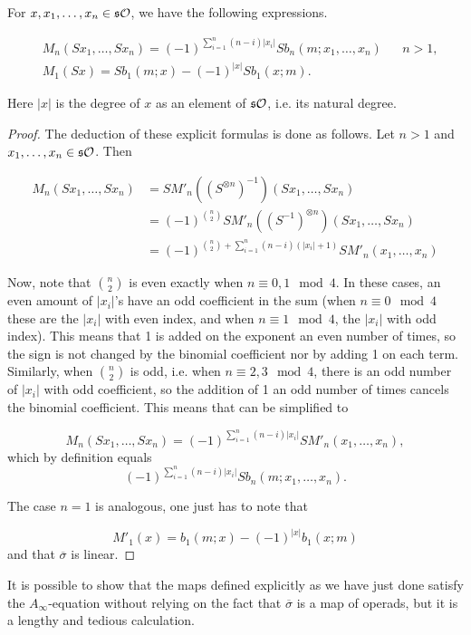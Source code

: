 \documentclass[Thesis.tex]{subfiles}
\begin{document}
\begin{lem}\label{explicit}
For $x,x_1,\dots,x_n\in\mathfrak{s}{\mathcal O}$, we have the following expressions.

\begin{align*}
&M_n(Sx_1,\dots, Sx_n)=(-1)^{\sum_{i=1}^n(n-i)|x_i|}Sb_n(m;x_1,\dots, x_n) & & n>1,\\
&M_1(Sx)=Sb_1(m;x)-(-1)^{|x|}Sb_1(x;m).
\end{align*}

Here $|x|$ is the degree of $x$ as an element of $\mathfrak{s}{\mathcal O}$, i.e. its natural degree. 
\end{lem}
\begin{proof}
The deduction of these explicit formulas is done as follows. Let $n>1$ and $x_1,\dots, x_n\in \mathfrak{s}{\mathcal O}$. Then

\begin{align}\label{aboveexpression}
M_n(Sx_1,\dots, Sx_n)&=SM'_n((S^{\otimes n})^{-1})(Sx_1,\dots, Sx_n)\nonumber\\
&=(-1)^{\binom{n}{2}}SM'_n((S^{-1})^{\otimes n})(Sx_1,\dots, Sx_n)\nonumber\\
&=(-1)^{\binom{n}{2}+\sum_{i=1}^n(n-i)(|x_i|+1)}SM'_n(x_1,\dots,x_n)
\end{align}

Now, note that $\binom{n}{2}$ is even exactly when $n\equiv 0,1\mod 4$. In these cases, an even amount of $|x_i|$'s have an odd coefficient in the sum (when $n\equiv 0\mod 4$ these are the $|x_i|$ with even index, and when $n\equiv 1\mod 4$, the $|x_i|$ with odd index). This means that 1 is added on the exponent an even number of times, so the sign is not changed by the binomial coefficient nor by adding 1 on each term. Similarly, when $\binom{n}{2}$ is odd, i.e. when $n\equiv 2,3\mod 4$, there is an odd number of $|x_i|$ with odd coefficient, so the addition of 1 an odd number of times cancels the binomial coefficient. This means that  can be simplified to

\[M_n(Sx_1,\dots, Sx_n)=(-1)^{\sum_{i=1}^n(n-i)|x_i|}SM'_n(x_1,\dots,x_n),\]
which by definition equals
\[(-1)^{\sum_{i=1}^n(n-i)|x_i|}Sb_n(m;x_1,\dots,x_n).\]

The case $n=1$ is analogous, one just has to note that 

\[
M'_1(x)=b_1(m;x)-(-1)^{|x|}b_1(x;m)
\]
and that $\overline{\sigma}$ is linear. 
\end{proof}

It is possible to show that the maps defined explicitly as we have just done satisfy the $A_\infty$-equation without relying on the fact that $\overline{\sigma}$ is a map of operads, but it is a lengthy and tedious calculation.
\end{document}
